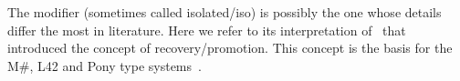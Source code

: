 






The \Q@capsule@ modifier (sometimes called isolated/iso) is possibly the one whose details differ the most in literature. Here we refer to its interpretation of~\cite{GordonEtAl12} that introduced the concept of recovery/promotion.
This concept is the basis for the M\#, L42 and Pony type systems~\cite{GordonEtAl12,ServettoEtAl13a,ServettoZucca15,ServettoEtAl13a,clebsch2015deny,clebsch2017orca}. 


